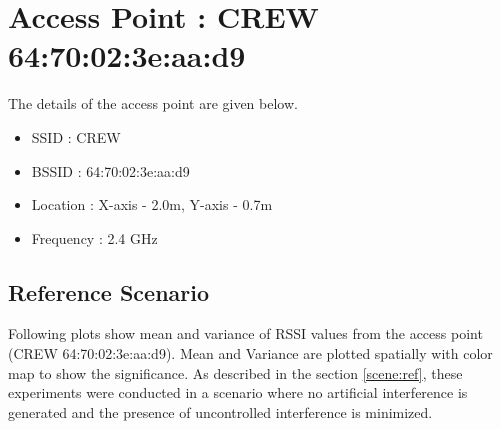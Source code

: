 \documentclass[11pt,a4paper,headinclude,footinclude,chapterprefix=on]{scrreprt}
\begin{document}
\begin{longtable}
\end{longtable}
\section{Access Point : CREW 64:70:02:3e:aa:d9} 
The details of the access point are given below.
\begin{itemize}
	\item SSID : CREW 
	\item BSSID : 64:70:02:3e:aa:d9 
	\item Location : X-axis - 2.0m, Y-axis - 0.7m 
	\item Frequency : 2.4 GHz 
\end{itemize}
\subsection{Reference Scenario} 
Following plots show mean and variance of RSSI values from the access point (CREW 64:70:02:3e:aa:d9). Mean and Variance are plotted spatially with color map to show the significance. As described in the section \ref{scene:ref}, these experiments were conducted in a scenario where no artificial interference is generated and the presence of uncontrolled interference is minimized.
\end{document}
